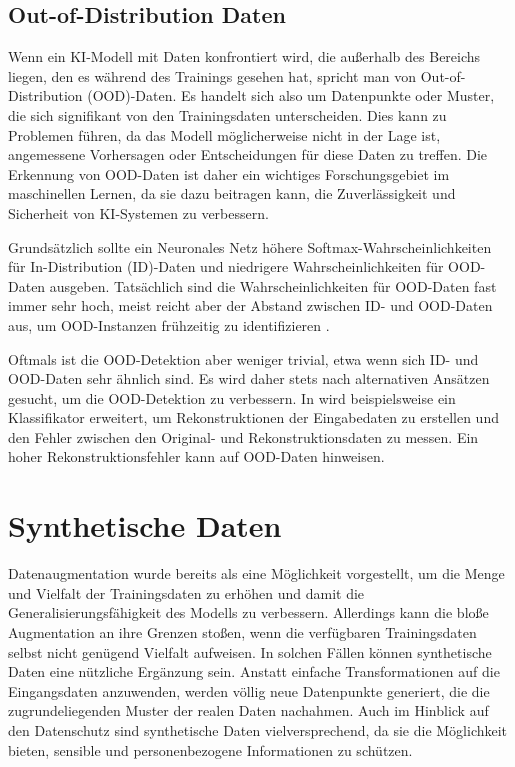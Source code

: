 \subsection{Out-of-Distribution Daten} \label{subsec:ood}

Wenn ein KI-Modell mit Daten konfrontiert wird, die außerhalb des Bereichs liegen, den es während des Trainings gesehen hat, spricht man von Out-of-Distribution (OOD)-Daten. Es handelt sich also um Datenpunkte oder Muster, die sich signifikant von den Trainingsdaten unterscheiden. Dies kann zu Problemen führen, da das Modell möglicherweise nicht in der Lage ist, angemessene Vorhersagen oder Entscheidungen für diese Daten zu treffen. Die Erkennung von OOD-Daten ist daher ein wichtiges Forschungsgebiet im maschinellen Lernen, da sie dazu beitragen kann, die Zuverlässigkeit und Sicherheit von KI-Systemen zu verbessern.

Grundsätzlich sollte ein Neuronales Netz höhere Softmax-Wahrscheinlichkeiten für In-Distribution (ID)-Daten und niedrigere Wahrscheinlichkeiten für OOD-Daten ausgeben. Tatsächlich sind die Wahrscheinlichkeiten für OOD-Daten fast immer sehr hoch, meist reicht aber der Abstand zwischen ID- und OOD-Daten aus, um OOD-Instanzen frühzeitig zu identifizieren \parencite{Hendrycks2018baselineooddetection}.

Oftmals ist die OOD-Detektion aber weniger trivial, etwa wenn sich ID- und OOD-Daten sehr ähnlich sind. Es wird daher stets nach alternativen Ansätzen gesucht, um die OOD-Detektion zu verbessern. In \parencite{Hendrycks2018baselineooddetection} wird beispielsweise ein Klassifikator erweitert, um Rekonstruktionen der Eingabedaten zu erstellen und den Fehler zwischen den Original- und Rekonstruktionsdaten zu messen. Ein hoher Rekonstruktionsfehler kann auf OOD-Daten hinweisen. %

\section{Synthetische Daten} \label{sec:synt-data}

Datenaugmentation wurde bereits als eine Möglichkeit vorgestellt, um die Menge und Vielfalt der Trainingsdaten zu erhöhen und damit die Generalisierungsfähigkeit des Modells zu verbessern. Allerdings kann die bloße Augmentation an ihre Grenzen stoßen, wenn die verfügbaren Trainingsdaten selbst nicht genügend Vielfalt aufweisen. In solchen Fällen können synthetische Daten eine nützliche Ergänzung sein. Anstatt einfache Transformationen auf die Eingangsdaten anzuwenden, werden völlig neue Datenpunkte generiert, die die zugrundeliegenden Muster der realen Daten nachahmen. Auch im Hinblick auf den Datenschutz sind synthetische Daten vielversprechend, da sie die Möglichkeit bieten, sensible und personenbezogene Informationen zu schützen.

